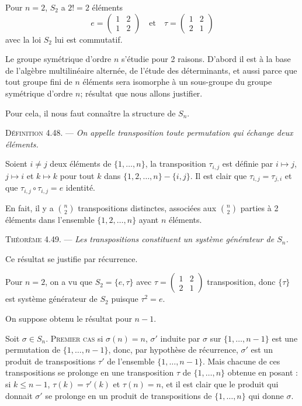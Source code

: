 Pour $n=2$, $S_2$ a $2!=2$ éléments
\[
e=\begin{pmatrix}1&2\\1&2\end{pmatrix}
\quad\text{et}\quad
\tau=\begin{pmatrix}1&2\\2&1\end{pmatrix}
\]
avec la loi $S_2$ lui est commutatif.

Le groupe symétrique d'ordre $n$ s'étudie pour 2 raisons. D'abord il est à la base de l'algèbre multilinéaire alternée, de l'étude des déterminants, et aussi parce que tout groupe fini de $n$ éléments sera isomorphe à un sous-groupe du groupe symétrique d'ordre $n$; résultat que nous allons justifier.

Pour cela, il nous faut connaître la structure de $S_n$.

\medskip\noindent\textsc{Définition 4.48.} --- \emph{On appelle transposition toute permutation qui échange deux éléments.}

Soient $i\ne j$ deux éléments de $\{1,\ldots,n\}$, la transposition $\tau_{i,j}$ est définie par $i\mapsto j$, $j\mapsto i$ et $k\mapsto k$ pour tout $k$ dans $\{1,2,\ldots,n\}-\{i,j\}$. Il est clair que $\tau_{i,j}=\tau_{j,i}$ et que $\tau_{i,j}\circ\tau_{i,j}=e$ identité.

En fait, il y a $\binom n2$ transpositions distinctes, associées aux $\binom n2$ parties à 2 éléments dans l'ensemble $\{1,2,\ldots,n\}$ ayant $n$ éléments.

\medskip\noindent\textsc{Théorème 4.49.} --- \emph{Les transpositions constituent un système générateur de $S_n$.}

Ce résultat se justifie par récurrence.

Pour $n=2$, on a vu que $S_2=\{e,\tau\}$ avec $\tau=\begin{pmatrix}1&2\\2&1\end{pmatrix}$ transposition, donc $\{\tau\}$ est système générateur de $S_2$ puisque $\tau^2=e$.

On suppose obtenu le résultat pour $n-1$.

Soit $\sigma\in S_n$. \textsc{Premier cas} si $\sigma(n)=n$, $\sigma'$ induite par $\sigma$ sur $\{1,\ldots,n-1\}$ est une permutation de $\{1,\ldots,n-1\}$, donc, par hypothèse de récurrence, $\sigma'$ est un produit de transpositions $\tau'$ de l'ensemble $\{1,\ldots,n-1\}$. Mais chacune de ces transpositions se prolonge en une transposition $\tau$ de $\{1,\ldots,n\}$ obtenue en posant : si $k\le n-1$, $\tau(k)=\tau'(k)$ et $\tau(n)=n$, et il est clair que le produit qui donnait $\sigma'$ se prolonge en un produit de transpositions de $\{1,\ldots,n\}$ qui donne $\sigma$.

